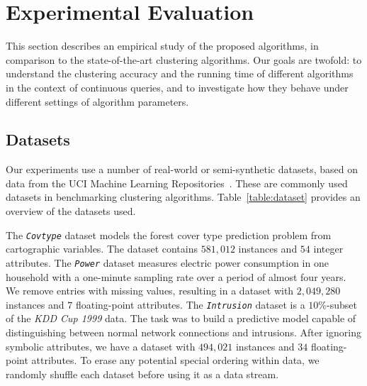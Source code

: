 \section{Experimental Evaluation}
\label{sec:expts}
\newcommand{\census}{\texttt{USCensus1990}\xspace}
\newcommand{\uscensus}{\texttt{USCensus1990}\xspace}
\newcommand{\tower}{\texttt{Tower}\xspace}
\newcommand{\covtype}{\texttt{Covtype}\xspace}
\newcommand{\power}{\texttt{Power}\xspace}
\newcommand{\intrusion}{\texttt{Intrusion}\xspace}
\newcommand{\drift}{\texttt{Drift}\xspace}


This section describes an empirical study of the proposed algorithms, in
comparison to the state-of-the-art clustering algorithms.  Our goals are
twofold: to understand the clustering accuracy and the running time of
different algorithms in the context of continuous queries, and to investigate
how they behave under different settings of algorithm parameters.

\subsection{Datasets}
Our experiments use a number of real-world or semi-synthetic datasets, based on
data from the UCI Machine Learning Repositories~\cite{Lichman13}.  These are
commonly used datasets in benchmarking clustering
algorithms. Table~\ref{table:dataset} provides an overview of the datasets used.

The \textit{\covtype} dataset models the forest cover type prediction problem
from cartographic variables. The dataset contains $581,012$ instances and $54$
integer attributes. The \textit{\power} dataset measures electric power
consumption in one household with a one-minute sampling rate over a period of
almost four years. We remove entries with missing values, resulting in a dataset
with $2,049,280$ instances and $7$ floating-point attributes. The
\textit{\intrusion} dataset is a $10\%$-subset of the \emph{KDD Cup 1999}
data. The task was to build a predictive model capable of distinguishing between
normal network connections and intrusions. After ignoring symbolic attributes,
we have a dataset with $494,021$ instances and $34$ floating-point
attributes. To erase any potential special ordering within data, we randomly
shuffle each dataset before using it as a data stream.

